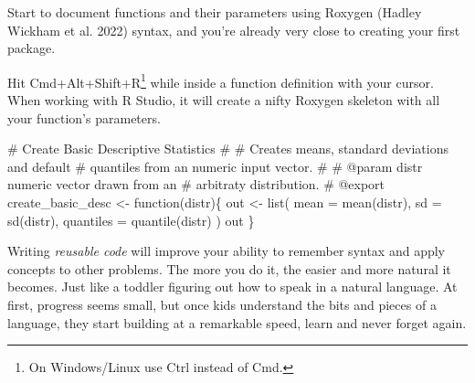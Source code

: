 \documentclass[
  12pt,
  letterpaper,
]{krantz}
\newenvironment{Shaded}{\begin{snugshade}}{\end{snugshade}}
\newcommand{\AttributeTok}[1]{\textcolor[rgb]{0.40,0.45,0.13}{#1}}
\newcommand{\CommentTok}[1]{\textcolor[rgb]{0.37,0.37,0.37}{#1}}
\newcommand{\ControlFlowTok}[1]{\textcolor[rgb]{0.00,0.23,0.31}{#1}}
\newcommand{\FunctionTok}[1]{\textcolor[rgb]{0.28,0.35,0.67}{#1}}
\newcommand{\NormalTok}[1]{\textcolor[rgb]{0.00,0.23,0.31}{#1}}
\newcommand{\OtherTok}[1]{\textcolor[rgb]{0.00,0.23,0.31}{#1}}
\begin{document}
Start to document functions and their parameters using Roxygen (Hadley
Wickham et al. 2022) syntax, and you're already very close to creating
your first package.

\begin{tcolorbox}[enhanced jigsaw, left=2mm, arc=.35mm, colbacktitle=quarto-callout-tip-color!10!white, breakable, colframe=quarto-callout-tip-color-frame, bottomrule=.15mm, bottomtitle=1mm, colback=white, leftrule=.75mm, coltitle=black, toptitle=1mm, titlerule=0mm, title=\textcolor{quarto-callout-tip-color}{\faLightbulb}\hspace{0.5em}{Tip}, opacityback=0, rightrule=.15mm, toprule=.15mm, opacitybacktitle=0.6]

Hit Cmd+Alt+Shift+R\footnote{On Windows/Linux use Ctrl instead of Cmd.}
while inside a function definition with your cursor. When working with R
Studio, it will create a nifty Roxygen skeleton with all your function's
parameters.

\end{tcolorbox}

\begin{Shaded}
\begin{Highlighting}[]
\CommentTok{\#\textquotesingle{} Create Basic Descriptive Statistics}
\CommentTok{\#\textquotesingle{}}
\CommentTok{\#\textquotesingle{} Creates means, standard deviations and default}
\CommentTok{\#\textquotesingle{} quantiles from an numeric input vector. }
\CommentTok{\#\textquotesingle{} }
\CommentTok{\#\textquotesingle{} @param distr numeric vector drawn from an}
\CommentTok{\#\textquotesingle{} arbitraty distribution. }
\CommentTok{\#\textquotesingle{} @export }
\NormalTok{create\_basic\_desc }\OtherTok{\textless{}{-}} \ControlFlowTok{function}\NormalTok{(distr)\{}
\NormalTok{  out }\OtherTok{\textless{}{-}} \FunctionTok{list}\NormalTok{(}
    \AttributeTok{mean =} \FunctionTok{mean}\NormalTok{(distr),}
    \AttributeTok{sd =} \FunctionTok{sd}\NormalTok{(distr),}
    \AttributeTok{quantiles =} \FunctionTok{quantile}\NormalTok{(distr)}
\NormalTok{  )}
\NormalTok{  out}
\NormalTok{\}}
\end{Highlighting}
\end{Shaded}

Writing \emph{reusable code} will improve your ability to remember
syntax and apply concepts to other problems. The more you do it, the
easier and more natural it becomes. Just like a toddler figuring out how
to speak in a natural language. At first, progress seems small, but once
kids understand the bits and pieces of a language, they start building
at a remarkable speed, learn and never forget again.
\end{document}
